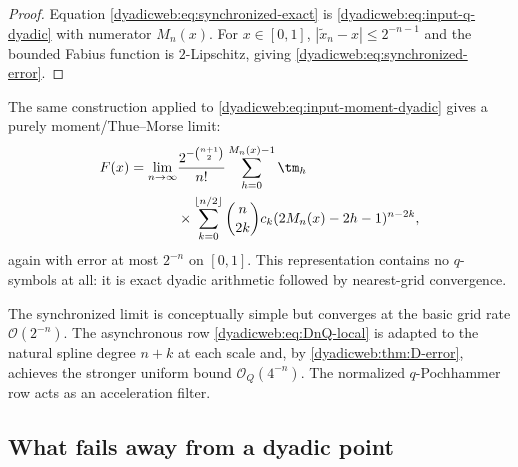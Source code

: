 \documentclass[11pt,oneside]{article}
\theoremstyle{definition}
\theoremstyle{remark}
\newcommand{\bigO}{\mathcal O}
\begin{document}
\begin{proof}
Equation \eqref{dyadicweb:eq:synchronized-exact} is
\eqref{dyadicweb:eq:input-q-dyadic} with numerator $M_n(x)$.  For $x\in[0,1]$,
$|\widetilde x_n-x|\le2^{-n-1}$ and the bounded Fabius function is $2$-Lipschitz, giving
\eqref{dyadicweb:eq:synchronized-error}.
\end{proof}

The same construction applied to \eqref{dyadicweb:eq:input-moment-dyadic} gives a purely
moment/Thue--Morse limit:
\begin{align}
 F(x)=\lim_{n\to\infty}
 &\frac{2^{-\binom{n+1}{2}}}{n!}
 \sum_{h=0}^{M_n(x)-1}\tm_h                              \notag\\
 &\times\sum_{k=0}^{\lfloor n/2\rfloor}
 \binom n{2k}c_k(2M_n(x)-2h-1)^{n-2k},                   \label{dyadicweb:eq:synchronized-moment-limit}
\end{align}
again with error at most $2^{-n}$ on $[0,1]$.  This representation contains no $q$-symbols at
all: it is exact dyadic arithmetic followed by nearest-grid convergence.

The synchronized limit is conceptually simple but converges at the basic grid rate
$\bigO(2^{-n})$.  The asynchronous row \eqref{dyadicweb:eq:DnQ-local} is adapted to the natural spline
degree $n+k$ at each scale and, by \cref{dyadicweb:thm:D-error}, achieves the stronger uniform bound
$\bigO_Q(4^{-n})$.  The normalized $q$-Pochhammer row acts as an acceleration filter.

\subsection{What fails away from a dyadic point}
\end{document}
